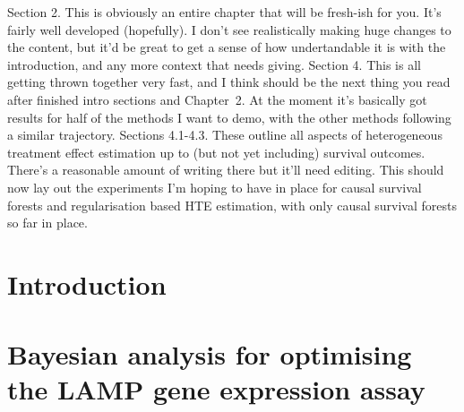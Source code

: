 \documentclass[12pt,twoside,openright]{report}
\theoremstyle{definition}
\begin{document}
{\begin{outline}
    \1 Section 2. This is obviously an entire chapter that will be fresh-ish for you. It's fairly well developed (hopefully). I don't see realistically making huge changes to the content, but it'd be great to get a sense of how undertandable it is with the introduction, and any more context that needs giving.
    \1 Section 4. This is all getting thrown together very fast, and I think should be the next thing you read after finished intro sections and Chapter~2. At the moment it's basically got results for half of the methods I want to demo, with the other methods following a similar trajectory. 
        \2 Sections 4.1-4.3. These outline all aspects of heterogeneous treatment effect estimation up to (but not yet including) survival outcomes. There's a reasonable amount of writing there but it'll need editing.
         This should now lay out the experiments I'm hoping to have in place for causal survival forests and regularisation based HTE estimation, with only causal survival forests so far in place.
    
\end{outline}
}

\chapter{Introduction \label{chap:intro}}




\chapter{Bayesian analysis for optimising the LAMP gene expression assay \label{chap:lamp_modelling}}
\end{document}
